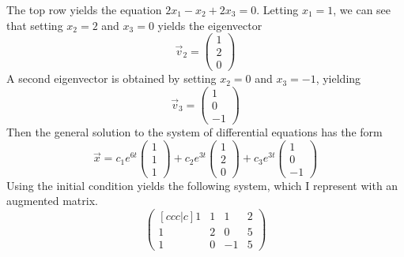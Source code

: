 \documentclass[11pt, titlepage]{article}
\begin{document}
\begin{enumerate}
\begin{solution}
\begin{equation*}
      \end{equation*}
      The top row yields the equation \(2x_{1} - x_{2} + 2x_{3} = 0\).
      Letting \(x_{1} = 1\), we can see that setting \(x_{2} = 2\) and \(x_{3} = 0\) yields the eigenvector
      \begin{equation*}
        \vec{v}_{2} =
        \begin{pmatrix}
          1 \\
          2 \\
          0
        \end{pmatrix}
      \end{equation*}
      A second eigenvector is obtained by setting \(x_{2} = 0\) and \(x_{3} = -1\), yielding
      \begin{equation*}
        \vec{v}_{3} =
        \begin{pmatrix}
          1 \\
          0 \\
          -1
        \end{pmatrix}
      \end{equation*}
      Then the general solution to the system of differential equations has the form
      \begin{equation*}
        \vec{x} = c_{1} e^{6t}
        \begin{pmatrix}
          1 \\
          1 \\
          1
        \end{pmatrix} +
        c_{2} e^{3t}
        \begin{pmatrix}
          1 \\
          2 \\
          0
        \end{pmatrix} +
        c_{3} e^{3t}
        \begin{pmatrix}
          1 \\
          0 \\
          -1
        \end{pmatrix}
      \end{equation*}
      Using the initial condition yields the following system, which I represent with an augmented matrix.
      \begin{equation*}
        \begin{pmatrix}[ccc|c]
          1 & 1 & 1 & 2 \\
          1 & 2 & 0 & 5 \\
          1 & 0 & -1 & 5
        \end{pmatrix}

\end{equation*}
\end{solution}
\end{enumerate}
\end{document}
